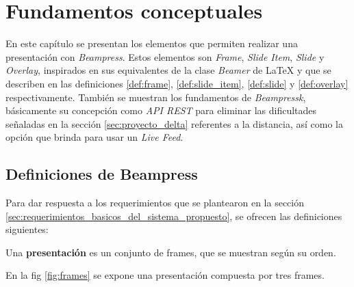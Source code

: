 
\chapter{Fundamentos conceptuales} %
\label{cha:fundamentos_conceptuales}
	En este capítulo se presentan los elementos que permiten realizar una presentación con \textit{Beampress}. Estos elementos son \textit{Frame}, \textit{Slide Item}, \textit{Slide} y \textit{Overlay}, inspirados en sus equivalentes de la clase \textit{Beamer} de \LaTeX{} y que se describen en las definiciones \ref{def:frame}, \ref{def:slide_item}, \ref{def:slide} y \ref{def:overlay} respectivamente. También se muestran los fundamentos de \textit{Beampressk}, básicamente su concepción como \textit{API REST} para eliminar las dificultades señaladas en la sección \ref{sec:proyecto_delta} referentes a la distancia, así como la opción que brinda para usar un \textit{Live Feed}. 

	\section{Definiciones de Beampress} %
	\label{sec:definiciones_de_beampress}
		Para dar respuesta a los requerimientos que se plantearon en la sección \ref{sec:requerimientos_basicos_del_sistema_propuesto}, se ofrecen las definiciones siguientes:

		
 		\begin{definition}
 		\label{def:presentation}
			Una \textbf{presentación} es un conjunto de frames, que se muestran según su orden.
 		\end{definition}

 		En la fig \ref{fig:frames} se expone una presentación compuesta por tres frames.

